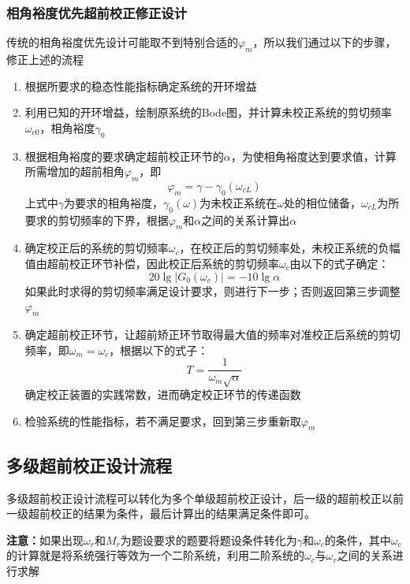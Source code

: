 \subsubsection{相角裕度优先超前校正修正设计}
传统的相角裕度优先设计可能取不到特别合适的$\varphi_m$，所以我们通过以下的步骤，修正上述的流程
\begin{enumerate}
    \item 根据所要求的稳态性能指标确定系统的开环增益
    \item 利用已知的开环增益，绘制原系统的Bode图，并计算未校正系统的剪切频率$\omega_{c0}$，相角裕度$\gamma_0$
    \item 根据相角裕度的要求确定超前校正环节的$\alpha$，为使相角裕度达到要求值，计算所需增加的超前相角$\varphi_m$，即
    \begin{equation*}
        \varphi_m = \gamma - \gamma_0(\omega_{cL})
    \end{equation*}
    上式中$\gamma$为要求的相角裕度，$\gamma_0(\omega)$为未校正系统在$\omega$处的相位储备，$\omega_{cL}$为所要求的剪切频率的下界，根据$\varphi_m$和$\alpha$之间的关系计算出$\alpha$
    \item 确定校正后的系统的剪切频率$\omega_c$，在校正后的剪切频率处，未校正系统的负幅值由超前校正环节补偿，因此校正后系统的剪切频率$\omega_c$由以下的式子确定：
    \begin{equation*}
        20 \lg \left\lvert G_0(\omega_c) \right\rvert = -10 \lg \alpha
    \end{equation*}
    如果此时求得的剪切频率满足设计要求，则进行下一步；否则返回第三步调整$\varphi_m$
    \item 确定超前校正环节，让超前矫正环节取得最大值的频率对准校正后系统的剪切频率，即$\omega_m = \omega_c$，根据以下的式子：
    \begin{equation*}
        T = \frac{1}{\omega_m \sqrt{\alpha}}
    \end{equation*}
    确定校正装置的实践常数，进而确定校正环节的传递函数
    \item 检验系统的性能指标，若不满足要求，回到第三步重新取$\varphi_m$
\end{enumerate}

\subsection{多级超前校正设计流程}
多级超前校正设计流程可以转化为多个单级超前校正设计，后一级的超前校正以前一级超前校正的结果为条件，最后计算出的结果满足条件即可。

\textbf{注意：}如果出现$\omega_r$和$M_r$为题设要求的题要将题设条件转化为$\gamma$和$\omega_c$的条件，其中$\omega_c$的计算就是将系统强行等效为一个二阶系统，利用二阶系统的$\omega_c$与$\omega_r$之间的关系进行求解

